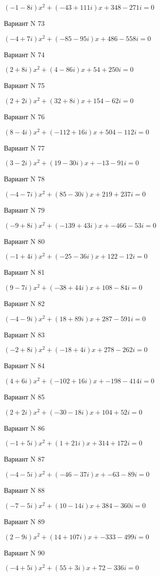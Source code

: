 \documentclass[11pt]{report}
\begin{document}
$(-1 - 8 i)x^2 + (-43 + 111 i)x + 348 - 271 i = 0$

Вариант N 73

$(-4 + 7 i)x^2 + (-85 - 95 i)x + 486 - 558 i = 0$

Вариант N 74

$(2 + 8 i)x^2 + (4 - 86 i)x + 54 + 250 i = 0$

Вариант N 75

$(2 + 2 i)x^2 + (32 + 8 i)x + 154 - 62 i = 0$

Вариант N 76

$(8 - 4 i)x^2 + (-112 + 16 i)x + 504 - 112 i = 0$

Вариант N 77

$(3 - 2 i)x^2 + (19 - 30 i)x + -13 - 91 i = 0$

Вариант N 78

$(-4 - 7 i)x^2 + (85 - 30 i)x + 219 + 237 i = 0$

Вариант N 79

$(-9 + 8 i)x^2 + (-139 + 43 i)x + -466 - 53 i = 0$

Вариант N 80

$(-1 + 4 i)x^2 + (-25 - 36 i)x + 122 - 12 i = 0$

Вариант N 81

$(9 - 7 i)x^2 + (-38 + 44 i)x + 108 - 84 i = 0$

Вариант N 82

$(-4 - 9 i)x^2 + (18 + 89 i)x + 287 - 591 i = 0$

Вариант N 83

$(-2 + 8 i)x^2 + (-18 + 4 i)x + 278 - 262 i = 0$

Вариант N 84

$(4 + 6 i)x^2 + (-102 + 16 i)x + -198 - 414 i = 0$

Вариант N 85

$(2 + 2 i)x^2 + (-30 - 18 i)x + 104 + 52 i = 0$

Вариант N 86

$(-1 + 5 i)x^2 + (1 + 21 i)x + 314 + 172 i = 0$

Вариант N 87

$(-4 - 5 i)x^2 + (-46 - 37 i)x + -63 - 89 i = 0$

Вариант N 88

$(-7 - 5 i)x^2 + (10 - 14 i)x + 384 - 360 i = 0$

Вариант N 89

$(2 - 9 i)x^2 + (14 + 107 i)x + -333 - 499 i = 0$

Вариант N 90

$(-4 + 5 i)x^2 + (55 + 3 i)x + 72 - 336 i = 0$
\end{document}
